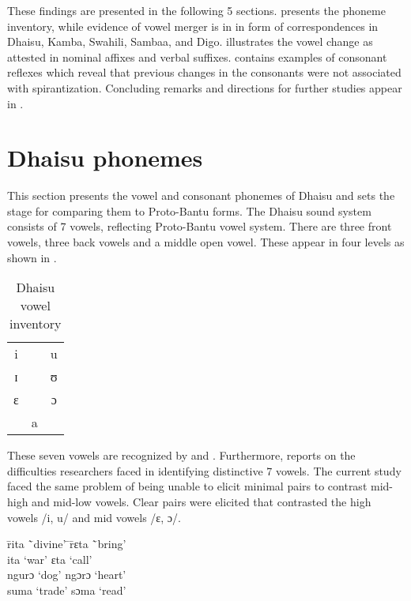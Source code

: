 \documentclass[output=paper,colorlinks,citecolor=brown]{langscibook}
\begin{document}
These findings are presented in the following 5 sections.  presents the phoneme inventory, while evidence of vowel merger is in  in form of correspondences in Dhaisu, Kamba, Swahili, Sambaa, and Digo.  illustrates the vowel change as attested in nominal affixes and verbal suffixes.  contains examples of consonant reflexes which reveal that previous changes in the consonants were not associated with spirantization. Concluding remarks and directions for further studies appear in .

\section{Dhaisu phonemes}\label{sec:ngonyani:2}

This section presents the vowel and consonant phonemes of Dhaisu and sets the stage for comparing them to Proto-Bantu forms. The Dhaisu sound system consists of 7 vowels, reflecting Proto-Bantu vowel system. There are three front vowels, three back vowels and a middle open vowel. These appear in four levels 
as shown in .


\begin{table}
	\caption{Dhaisu vowel inventory \citep[4]{RugemaliraEtAl2019}}
    \label{tab:ngonyani:1}
    \begin{tabular}{ccc}
        i   &     & u\\
        ɪ   &     & ʊ\\
        ɛ   &     & ɔ\\
            & a   & \\
    \end{tabular}
\end{table}
These seven vowels are recognized by \citet{Nurse2000}  and \citet{RugemaliraEtAl2019}. Furthermore, \citet[20]{Nurse2000} reports on the difficulties researchers faced in identifying distinctive 7 vowels. The current study faced the same problem of being unable to elicit minimal pairs to contrast mid-high and mid-low vowels. Clear pairs were elicited that contrasted the high vowels /i, u/ and mid vowels /ɛ, ɔ/.

\ea%
    \label{ex:ngonyani:1}
    \begin{tabbing}
        \= rita \quad\= `divine' \quad\= \quad\=  rɛta \quad\= `bring'\\
        \> ita \> `war' \> \> ɛta \> `call'\\
        \> ngurɔ \> `dog' \> \> ngɔrɔ \> `heart' \\
        \> suma \> `trade' \> \> sɔma \> `read'
\end{tabbing}
\z
\end{document}
